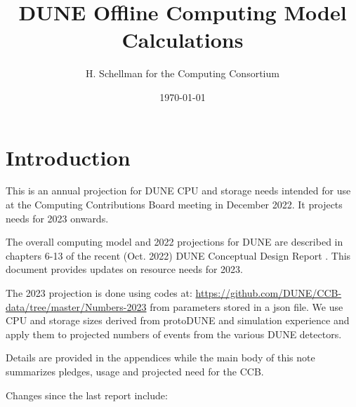 \documentclass[12pt]{article}
\title{DUNE Offline Computing Model Calculations}
\author{H. Schellman for the Computing Consortium}
\date{\today}
\begin{document}
\makeatletter
{}
\makeatother
\newcommand{\csvautotabularright}[2][]{\csvloop{autotabularright={#2},#1}}

\maketitle
\section{Introduction}

This is an annual projection for DUNE CPU and storage needs intended for use at the Computing Contributions Board meeting in December 2022. It projects needs for 2023 onwards. 

The overall computing model  and 2022 projections for DUNE are described in chapters 6-13 of the recent (Oct. 2022) DUNE Conceptual Design Report \cite{DUNE:2022fcw}.   This document provides updates on resource needs for 2023. 

The 2023 projection is done using codes at: \href{https://github.com/DUNE/CCB-data/tree/master/Numbers-2023}{https://github.com/DUNE/CCB-data/tree/master/Numbers-2023} from parameters stored in a json file. We use CPU and storage sizes derived from protoDUNE and simulation experience and apply them to projected numbers of events from the various DUNE detectors. 

Details are provided in the appendices while the main body of this note summarizes pledges, usage and projected need for the CCB.




Changes since the last report include:
\end{document}
